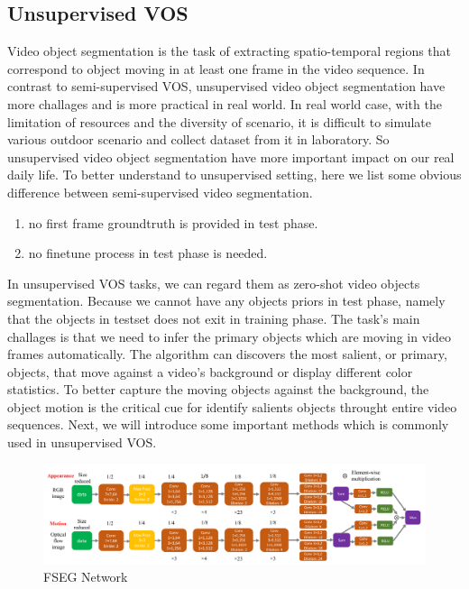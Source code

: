 \subsection{Unsupervised VOS}
Video object segmentation is the task of extracting spatio-temporal regions that correspond to object moving in at
least one frame in the video sequence. In contrast to semi-supervised VOS, unsupervised video object segmentation have 
more challages and is more practical in real world. In real world case, with the limitation of resources and the diversity of scenario,
it is difficult to simulate various outdoor scenario and collect dataset from it in laboratory. So unsupervised video object 
segmentation have more important impact on our real daily life. To better understand to unsupervised setting, here we list some
obvious difference between semi-supervised video segmentation.
\begin{enumerate}
    \item no first frame groundtruth is provided in test phase.
    \item no finetune process in test phase is needed.
\end{enumerate}

In unsupervised VOS tasks, we can regard them as zero-shot video objects segmentation. Because we cannot have any objects priors
in test phase, namely that the objects in testset does not exit in training phase. The task's main challages is that we need to infer
the primary objects which are moving in video frames automatically. The algorithm can discovers the most salient, or primary, objects,
that move against a video's background or display different color statistics. To better capture the moving objects against the background,
the object motion is the critical cue for identify salients objects throught entire video sequences. Next, we will introduce some important
methods which is commonly used in unsupervised VOS.

\begin{figure}
    \begin{center}
    \includegraphics[width=\textwidth]{figure/FSEG_NET.png}
    \end{center}
    \caption{FSEG Network}
    \label{FSEG}
\end{figure}

